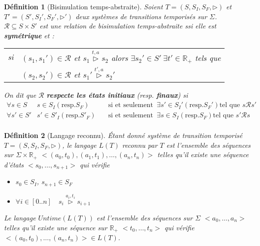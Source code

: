 \documentclass[a4paper]{article}
\newtheorem{definition}{Définition}
\begin{document}
\begin{definition}[Bisimulation temps-abstraite]
Soient $T=(S,S_I,S_F,\rhd)$ et $T'=(S',S_I',S_F',\rhd')$ deux systèmes
de transitions temporisés sur $\Sigma$.
$\mathcal{R} \subseteq S\times S'$ est une relation de bisimulation
temps-abstraite ssi elle est \textbf{symétrique} et :

\begin{tabular}{ll}
 si &$(s_1,s_1')\in \mathcal{R}$ et $s_1 \overset{t,a}{\rhd}s_2$ alors
  $\exists s_2'\in S' \ \exists t'\in \mathbb{R}_+$ tels que\\
  &$(s_2,s_2')\in \mathcal{R}$ et $s_1'\overset{t',a}{\rhd}s_2'$\\
\end{tabular}

On dit que $\mathcal{R}$ \textbf{respecte les états initiaux} (resp. \textbf{finaux}) si \\
$
\begin{array}{llcl}
\forall s\in S & s\in S_I (\text{resp.} S_F)& \quad \text{si et
  seulement si} \quad & \exists s'\in S_I' (\text{resp.} S_F') \text{
  tel que } s\mathcal{R}s'\\
\forall s'\in S' & s'\in S'_I (\text{resp.} S'_F)& \quad \text{si et
  seulement si} \quad & \exists s\in S_I (\text{resp.} S_F) \text{
  tel que } s'\mathcal{R}s\\
\end{array}
$
\end{definition}

\begin{definition}[Langage reconnu]
Étant donné système de transition temporisé $T=(S,S_I,S_F,\rhd)$, le
langage $L(T)$ reconnu
par $T$ est l'ensemble des séquences sur $\Sigma\times \mathbb{R}_+$ $<(a_0,t_0), (a_1,t_1), \ldots,
(a_n,t_n)>$ telles qu'il existe une séquence d'états
$<s_0,\ldots,s_{n+1}>$ qui vérifie 
\begin{itemize}
\item $s_0\in S_I$, $s_{n+1}\in S_F$
\item $\forall i\in [0..n] \quad s_i \overset{a_i,t_i}{\rhd}s_{i+1}$
\end{itemize}


Le langage $Untime(L(T))$ est l'ensemble des séquences sur $\Sigma$
$<a_0,\ldots ,a_n>$ telles qu'il existe une séquence sur $\mathbb{R}_+$
$<t_0, \ldots ,t_n>$ qui vérifie $<(a_0,t_0),\ldots ,(a_n,t_n)>\in L(T)$.
\end{definition}
\end{document}

